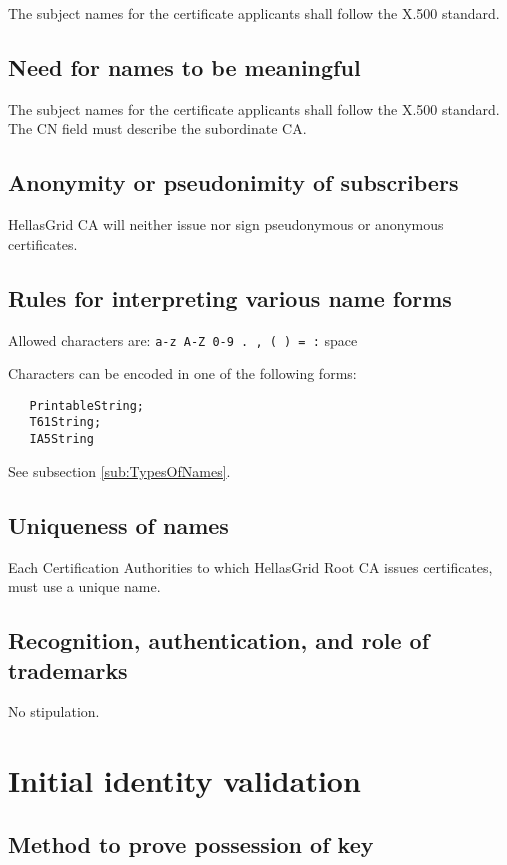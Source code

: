 \documentclass[11pt,a4paper,titlepage]{book}
\begin{document}
The subject names for the certificate applicants shall follow the X.500 standard. 


\subsection{Need for names to be meaningful}

The subject names for the certificate applicants shall follow the X.500 standard. The CN field must describe the subordinate CA. 

\subsection{Anonymity or pseudonimity of subscribers}

HellasGrid CA will neither issue nor sign pseudonymous or anonymous certificates.

\subsection{Rules for interpreting various name forms}

Allowed characters are: \verb|a-z A-Z 0-9 . , ( ) = :| space

Characters can be encoded in one of the following forms:

\begin{verbatim}
   PrintableString;
   T61String;
   IA5String
\end{verbatim}

See subsection \ref{sub:TypesOfNames}.

\subsection{Uniqueness of names}

Each Certification Authorities to which HellasGrid Root CA issues certificates, must use a unique name.

\subsection{Recognition, authentication, and role of trademarks}

No stipulation. 

\section{Initial identity validation}


\subsection{Method to prove possession of key}
\end{document}
